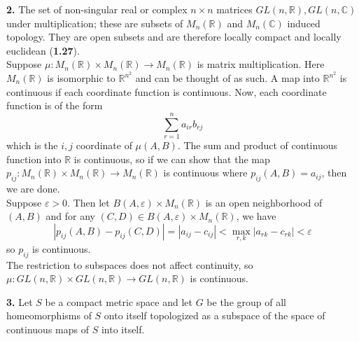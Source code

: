 \documentclass[a4paper]{article}
\theoremstyle{plain}%
\theoremstyle{definition}
\theoremstyle{remark}
\begin{document}
    \textbf{2.} The set of non-singular real or complex $n \times n$ matrices
    $GL(n,\mathbb{R}), GL(n,\mathbb{C})$ under multiplication; these are
    subsets
    of $M_n(\mathbb{R})$ and $M_n(\mathbb{C})$
    induced topology. They are open subsets and are therefore locally compact
    and locally euclidean (\textbf{1.27}).\\
    \linebreak
    Suppose $\mu  \colon M_n(\mathbb{R}) \times M_n(\mathbb{R}) \to
    M_n(\mathbb{R})$ is matrix multiplication. Here $M_n(\mathbb{R})$ is
    isomorphic to $\mathbb{R}^{n^2}$ and can be thought of as such. A map
    into $\mathbb{R}^{n^2}$ is continuous if each coordinate function is
    continuous. Now, each coordinate function is of the form
    \[
    \sum_{r=1}^{n} a_{ir} b_{rj}
    \] 
     which is the $i,j$ coordinate of $\mu(A,B)$. The sum and product of
     continuous function into $\mathbb{R}$ is continuous, so if we can show
     that
     the map $p_{ij}  \colon M_n(\mathbb{R}) \times
     M_n(\mathbb{R}) \to M_n(\mathbb{R})$ is continuous where 
      $p_{ij}(A,B) = a_{ij}$, then we are done.\\
      Suppose $\varepsilon > 0$. Then
      let  $B(A, \varepsilon) \times M_n(\mathbb{R})$ is an open neighborhood
      of $(A,B)$ and for any $(C,D) \in B(A,\varepsilon) \times
      M_n(\mathbb{R})$, we have
       \[
      \left| p_{ij}(A,B) - p_{ij}(C,D) \right| 
      = \left| a_{ij} - c_{ij} \right| <
      \max_{r,k} \left| a_{rk} - c_{rk} \right| 
      < \varepsilon
      \] 
      so $p_{ij}$ is continuous.\\
      \linebreak
      The restriction to subspaces does not affect continuity, so
      $\mu  \colon GL(n,\mathbb{R}) \times GL(n, \mathbb{R}) \to
      GL(n,\mathbb{R})$ is continuous.\\
      \linebreak
      
      
      



















    \textbf{3.} Let $S$ be a compact metric space and let
    $G$ be the group of all homeomorphisms of $S$ onto itself topologized as
    a subspace of the space of continuous maps of $S$ into itself.\\
    \linebreak
\end{document}
